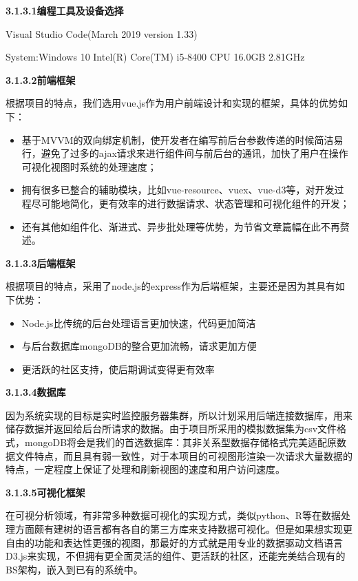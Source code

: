 {\textbf{3.1.3.1\quad 编程工具及设备选择}}

Visual Studio Code(March 2019 version 1.33)

System:Windows 10  Intel(R) Core(TM) i5-8400 CPU 16.0GB 2.81GHz

{\textbf{3.1.3.2\quad 前端框架}}

根据项目的特点，我们选用vue.js作为用户前端设计和实现的框架，具体的优势如下：
\begin{itemize}
	\item 基于MVVM的双向绑定机制，使开发者在编写前后台参数传递的时候简洁易行，避免了过多的ajax请求来进行组件间与前后台的通讯，加快了用户在操作可视化视图时系统的处理速度；
	\item 拥有很多已整合的辅助模块，比如vue-resource、vuex、vue-d3等，对开发过程尽可能地简化，更有效率的进行数据请求、状态管理和可视化组件的开发；
	\item 还有其他如组件化、渐进式、异步批处理等优势，为节省文章篇幅在此不再赘述。
\end{itemize}

{\textbf{3.1.3.3\quad 后端框架}}

根据项目的特点，采用了node.js的express作为后端框架，主要还是因为其具有如下优势：

\begin{itemize}
	\item Node.js比传统的后台处理语言更加快速，代码更加简洁
	\item 与后台数据库mongoDB的整合更加流畅，请求更加方便
	\item 更活跃的社区支持，使后期调试变得更有效率
\end{itemize}

{\textbf{3.1.3.4\quad 数据库}}

因为系统实现的目标是实时监控服务器集群，所以计划采用后端连接数据库，用来储存数据并返回给后台所请求的数据。由于项目所采用的模拟数据集为csv文件格式，mongoDB将会是我们的首选数据库：其非关系型数据存储格式完美适配原数据文件特点，而且具有弱一致性，对于本项目的可视图形渲染一次请求大量数据的特点，一定程度上保证了处理和刷新视图的速度和用户访问速度。

{\textbf{3.1.3.5\quad 可视化框架}}

在可视分析领域，有非常多种数据可视化的实现方式，类似python、R等在数据处理方面颇有建树的语言都有各自的第三方库来支持数据可视化。但是如果想实现更自由的功能和表达性更强的视图，那最好的方式就是用专业的数据驱动文档语言D3.js来实现，不但拥有更全面灵活的组件、更活跃的社区，还能完美结合现有的BS架构，嵌入到已有的系统中。

